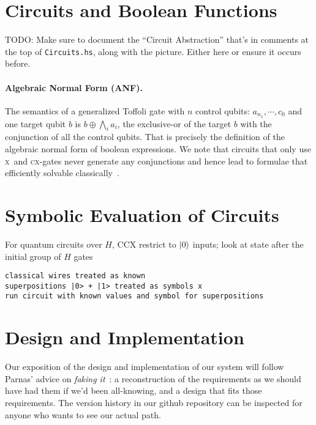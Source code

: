 \documentclass[sigplan]{acmart}
\newcommand{\x}{\textsc{x}}
\newcommand{\cx}{\textsc{cx}}
\begin{document}
\section{Circuits and Boolean Functions}
 
TODO: Make sure to document the ``Circuit Abstraction'' that's in comments
at the top of \texttt{Circuits.hs}, along with the picture. Either here or
ensure it occurs before.

\paragraph*{Algebraic Normal Form (ANF).}
The semantics of a generalized Toffoli gate with $n$ control qubits:
$a_{n_1},\cdots,c_0$ and one target qubit $b$ is $b \oplus \bigwedge_i
a_i$, the exclusive-or of the target $b$ with the conjunction of all
the control qubits. That is precisely the definition of the algebraic
normal form of boolean expressions. We note that circuits that only
use \x\ and \cx-gates never generate any conjunctions and hence lead
to formulae that efficiently solvable
classically~\cite{10.5555/35517,TOKAREVA20151}.

\section{Symbolic Evaluation of Circuits}

For quantum circuits over $H$, CCX
restrict to $\ket{0}$ inputs; look at state after the initial group of
$H$ gates
\begin{verbatim}
classical wires treated as known
superpositions |0> + |1> treated as symbols x
run circuit with known values and symbol for superpositions
\end{verbatim}

\section{Design and Implementation}

Our exposition of the design and implementation of our system will
follow Parnas' advice on \emph{faking it}~\cite{ParnasFake}: a reconstruction
of the requirements as we should have had them if we'd been all-knowing,
and a design that fits those requirements. The version history in our github
repository can be inspected for anyone who wants to see our actual path.
\end{document}
